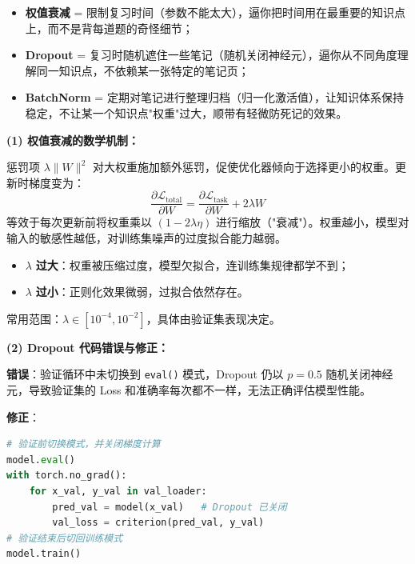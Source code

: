 \documentclass[a4paper,11pt]{ctexart}
\begin{document}
\begin{metaphorbox}
    \begin{itemize}
        \item \textbf{权值衰减} = 限制复习时间（参数不能太大），逼你把时间用在最重要的知识点上，而不是背每道题的奇怪细节；
        \item \textbf{Dropout} = 复习时随机遮住一些笔记（随机关闭神经元），逼你从不同角度理解同一知识点，不依赖某一张特定的笔记页；
        \item \textbf{BatchNorm} = 定期对笔记进行整理归档（归一化激活值），让知识体系保持稳定，不让某一个知识点"权重"过大，顺带有轻微防死记的效果。
    \end{itemize}
\end{metaphorbox}

\begin{solutionbox}[参考答案与详细解析]
    \textbf{(1) 权值衰减的数学机制：}

    惩罚项 $\lambda\|W\|^2$ 对大权重施加额外惩罚，促使优化器倾向于选择更小的权重。更新时梯度变为：
    \[
    \frac{\partial \mathcal{L}_{\text{total}}}{\partial W} = \frac{\partial \mathcal{L}_{\text{task}}}{\partial W} + 2\lambda W
    \]
    等效于每次更新前将权重乘以 $(1-2\lambda\eta)$ 进行缩放（"衰减"）。权重越小，模型对输入的敏感性越低，对训练集噪声的过度拟合能力越弱。

    \begin{itemize}
        \item $\lambda$ \textbf{过大}：权重被压缩过度，模型欠拟合，连训练集规律都学不到；
        \item $\lambda$ \textbf{过小}：正则化效果微弱，过拟合依然存在。
    \end{itemize}
    常用范围：$\lambda \in [10^{-4}, 10^{-2}]$，具体由验证集表现决定。

    \textbf{(2) Dropout 代码错误与修正：}

    \textbf{错误}：验证循环中未切换到 \texttt{eval()} 模式，Dropout 仍以 $p=0.5$ 随机关闭神经元，导致验证集的 Loss 和准确率每次都不一样，无法正确评估模型性能。

    \textbf{修正}：
    \begin{lstlisting}[language=Python]
# 验证前切换模式，并关闭梯度计算
model.eval()
with torch.no_grad():
    for x_val, y_val in val_loader:
        pred_val = model(x_val)   # Dropout 已关闭
        val_loss = criterion(pred_val, y_val)
# 验证结束后切回训练模式
model.train()
    \end{lstlisting}


\end{solutionbox}
\end{document}
